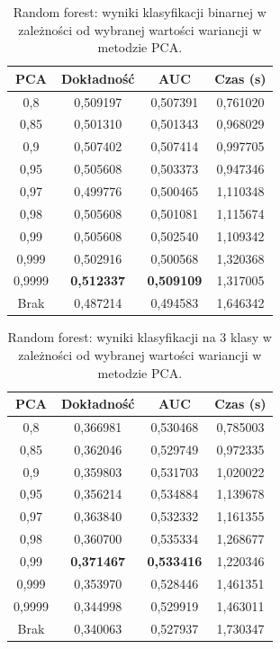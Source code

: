 \documentclass[a4paper, twoside, 11pt, openright]{article}
\begin{document}
\begin{table}[H]
    \centering
    \begin{tabular}{|c|c|c|c|}
    \hline
        \textbf{PCA} & \textbf{Dokładność} & \textbf{AUC} & \textbf{Czas (s)} \\ \hline
0,8                &  0,509197 &  0,507391 &    0,761020 \\ \hline
0,85               &  0,501310 &  0,501343 &    0,968029 \\ \hline
0,9                &  0,507402 &  0,507414 &    0,997705 \\ \hline
0,95               &  0,505608 &  0,503373 &    0,947346 \\ \hline
0,97               &  0,499776 &  0,500465 &    1,110348 \\ \hline
0,98               &  0,505608 &  0,501081 &    1,115674 \\ \hline
0,99               &  0,505608 &  0,502540 &    1,109342 \\ \hline
0,999			   &  0,502916 &  0,500568 &    1,320368 \\ \hline
0,9999             &  \textbf{0,512337} &  \textbf{0,509109} &    1,317005 \\ \hline
Brak                &  0,487214 &  0,494583 &    1,646342 \\ \hline
    \end{tabular}
    \caption{Random forest: wyniki klasyfikacji binarnej w zależności od wybranej wartości wariancji w metodzie PCA.}
    \label{tab:rf_pca_binary}
\end{table}
\begin{table}[H]
    \centering
    \begin{tabular}{|c|c|c|c|}
    \hline
        \textbf{PCA} & \textbf{Dokładność} & \textbf{AUC} & \textbf{Czas (s)} \\ \hline
0,8                &  0,366981 &  0,530468 &    0,785003 \\ \hline
0,85               &  0,362046 &  0,529749 &    0,972335 \\ \hline
0,9                &  0,359803 &  0,531703 &    1,020022 \\ \hline
0,95               &  0,356214 &  0,534884 &    1,139678 \\ \hline
0,97               &  0,363840 &  0,532332 &    1,161355 \\ \hline
0,98               &  0,360700 &  0,535334 &    1,268677 \\ \hline
0,99               &  \textbf{0,371467} &  \textbf{0,533416} &    1,220346 \\ \hline
0,999		       &  0,353970 &  0,528446 &    1,461351 \\ \hline
0,9999             &  0,344998 &  0,529919 &    1,463011 \\ \hline
Brak                &  0,340063 &  0,527937 &    1,730347 \\ \hline
    \end{tabular}
    \caption{Random forest: wyniki klasyfikacji na 3 klasy w zależności od wybranej wartości wariancji w metodzie PCA.}
    \label{tab:rf_pca_discrete}
\end{table}
\end{document}
